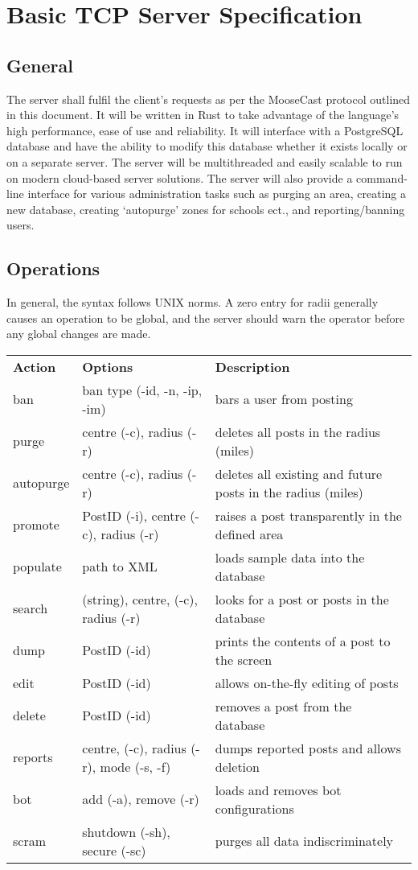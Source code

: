 \documentclass[12pt, a4paper]{article}
\begin{document}
\section{Basic TCP Server Specification}
\subsection{General}
The server shall fulfil the client's requests as per the MooseCast protocol outlined in this document. It will be written in Rust to take advantage of the language's high performance, ease of use and reliability. It will interface with a PostgreSQL database and have the ability to modify this database whether it exists locally or on a separate server. The server will be multithreaded and easily scalable to run on modern cloud-based server solutions. The server will also provide a command-line interface for various administration tasks such as purging an area, creating a new database, creating `autopurge' zones for schools ect., and reporting/banning users.

\subsection{Operations}
In general, the syntax follows UNIX norms. A zero entry for radii generally causes an operation to be global, and the server should warn the operator before any global changes are made.
\begin{table}[h]
\centering
\begin{tabular}{lll}
\textbf{Action} & \textbf{Options} &\textbf{Description}\\
ban & ban type (-id, -n, -ip, -im) & bars a user from posting\\
purge & centre (-c), radius (-r) & deletes all posts in the radius (miles)\\
autopurge & centre (-c), radius (-r) & deletes all existing and future posts in the radius (miles)\\
promote & PostID (-i), centre (-c), radius (-r) & raises a post transparently in the defined area\\
populate & path to XML & loads sample data into the database\\
search & (string), centre, (-c), radius (-r) & looks for a post or posts in the database\\
dump & PostID (-id) & prints the contents of a post to the screen\\
edit & PostID (-id) & allows on-the-fly editing of posts\\
delete & PostID (-id) & removes a post from the database\\
reports & centre, (-c), radius (-r), mode (-s, -f) & dumps reported posts and allows deletion\\
bot & add (-a), remove (-r) & loads and removes bot configurations\\
scram & shutdown (-sh), secure (-sc) & purges all data indiscriminately\\
\end{tabular}
\end{table}
\end{document}
